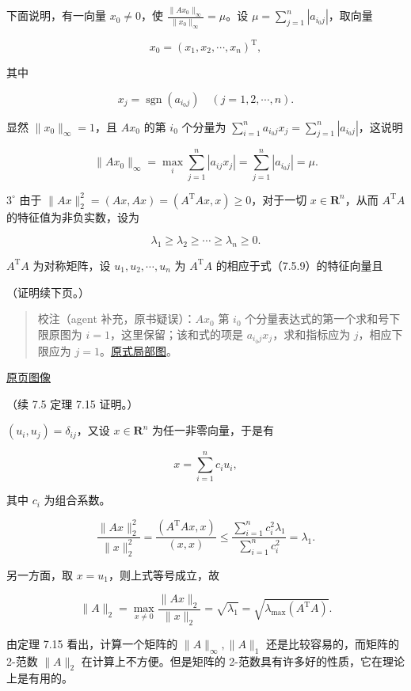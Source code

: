 \documentclass[
  10pt,
  fontset=fandol]{ctexart}
\begin{document}
下面说明，有一向量 \(x_0\neq0\)，使 \(\frac{\|Ax_0\|_\infty}{\|x_0\|_\infty}=\mu\)。设 \(\mu=\sum_{j=1}^{n}|a_{i_0j}|\)，取向量

\[
x_0=(x_1,x_2,\cdots,x_n)^{\mathrm T},
\]

其中

\[
x_j=\operatorname{sgn}(a_{i_0j})\quad(j=1,2,\cdots,n).
\]

显然 \(\|x_0\|_\infty=1\)，且 \(Ax_0\) 的第 \(i_0\) 个分量为 \(\sum_{i=1}^{n}a_{i_0j}x_j=\sum_{j=1}^{n}|a_{i_0j}|\)，这说明

\[
\|Ax_0\|_\infty=\max_i\sum_{j=1}^{n}|a_{ij}x_j|=\sum_{j=1}^{n}|a_{i_0j}|=\mu.
\]

\(3^\circ\) 由于 \(\|Ax\|_2^2=(Ax,Ax)=(A^{\mathrm T}Ax,x)\geqslant0\)，对于一切 \(x\in\mathbf R^n\)，从而 \(A^{\mathrm T}A\) 的特征值为非负实数，设为

\[
\lambda_1\geqslant\lambda_2\geqslant\cdots\geqslant\lambda_n\geqslant0.
\tag{7.5.9}
\]

\(A^{\mathrm T}A\) 为对称矩阵，设 \(u_1,u_2,\cdots,u_n\) 为 \(A^{\mathrm T}A\) 的相应于式（7.5.9）的特征向量且

（证明续下页。）

\begin{quote}
校注（agent 补充，原书疑误）：\(Ax_0\) 第 \(i_0\) 个分量表达式的第一个求和号下限原图为 \(i=1\)，这里保留；该和式的项是 \(a_{i_0j}x_j\)，求和指标应为 \(j\)，相应下限应为 \(j=1\)。\href{../assets/ch07b/203-sum-index.png}{原式局部图}。
\end{quote}

\href{../../source-images/pdf-204.jpeg}{原页图像}

（续 7.5 定理 7.15 证明。）

\((u_i,u_j)=\delta_{ij}\)，又设 \(x\in\mathbf R^n\) 为任一非零向量，于是有

\[
x=\sum_{i=1}^{n}c_iu_i,
\]

其中 \(c_i\) 为组合系数。

\[
\frac{\|Ax\|_2^2}{\|x\|_2^2}
=\frac{(A^{\mathrm T}Ax,x)}{(x,x)}
\leqslant\frac{\sum_{i=1}^{n}c_i^2\lambda_1}{\sum_{i=1}^{n}c_i^2}=\lambda_1.
\]

另一方面，取 \(x=u_1\)，则上式等号成立，故

\[
\|A\|_2=\max_{x\neq0}\frac{\|Ax\|_2}{\|x\|_2}=\sqrt{\lambda_1}=\sqrt{\lambda_{\max}(A^{\mathrm T}A)}.
\]

由定理 7.15 看出，计算一个矩阵的 \(\|A\|_\infty,\|A\|_1\) 还是比较容易的，而矩阵的 2-范数 \(\|A\|_2\) 在计算上不方便。但是矩阵的 2-范数具有许多好的性质，它在理论上是有用的。
\end{document}

